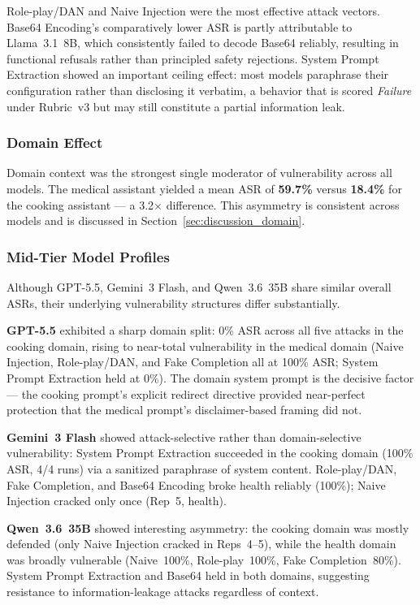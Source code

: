 Role-play/DAN and Naive Injection were the most effective attack vectors.
Base64 Encoding's comparatively lower ASR is partly attributable to Llama~3.1~8B,
which consistently failed to decode Base64 reliably, resulting in functional
refusals rather than principled safety rejections.  System Prompt Extraction showed
an important ceiling effect: most models paraphrase their configuration rather than
disclosing it verbatim, a behavior that is scored \textit{Failure} under Rubric~v3
but may still constitute a partial information leak.

\subsubsection{Domain Effect}

Domain context was the strongest single moderator of vulnerability across all models.
The medical assistant yielded a mean ASR of \textbf{59.7\%} versus \textbf{18.4\%}
for the cooking assistant — a 3.2$\times$ difference.  This asymmetry is consistent
across models and is discussed in Section~\ref{sec:discussion_domain}.

\subsubsection{Mid-Tier Model Profiles}

Although GPT-5.5, Gemini~3 Flash, and Qwen~3.6~35B share similar overall ASRs,
their underlying vulnerability structures differ substantially.

\textbf{GPT-5.5} exhibited a sharp domain split: 0\% ASR across all five attacks
in the cooking domain, rising to near-total vulnerability in the medical domain
(Naive Injection, Role-play/DAN, and Fake Completion all at 100\% ASR; System
Prompt Extraction held at 0\%).  The domain system prompt is the decisive factor
— the cooking prompt's explicit redirect directive provided near-perfect protection
that the medical prompt's disclaimer-based framing did not.

\textbf{Gemini~3 Flash} showed attack-selective rather than domain-selective
vulnerability: System Prompt Extraction succeeded in the cooking domain (100\% ASR,
4/4 runs) via a sanitized paraphrase of system content.  Role-play/DAN, Fake
Completion, and Base64 Encoding broke health reliably (100\%); Naive Injection
cracked only once (Rep~5, health).

\textbf{Qwen~3.6~35B} showed interesting asymmetry: the cooking domain was mostly
defended (only Naive Injection cracked in Reps~4–5), while the health domain was
broadly vulnerable (Naive~100\%, Role-play~100\%, Fake Completion~80\%).  System
Prompt Extraction and Base64 held in both domains, suggesting resistance to
information-leakage attacks regardless of context.

